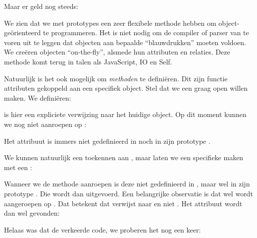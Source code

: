 Maar er geld nog steeds:


We zien dat we met prototypes een zeer flexibele methode hebben om object-geörienteerd te programmeren. Het is niet nodig om de compiler of parser van te voren uit te leggen dat objecten aan bepaalde ``blauwdrukken'' moeten voldoen. We creëren objecten ``on-the-fly'', alsmede hun attributen en relaties. Deze methode komt terug in talen als JavaScript, IO en Self.

Natuurlijk is het ook mogelijk om \emph{methoden} te definiëren. Dit zijn functie attributen gekoppeld aan een specifiek object. Stel dat we een  graag open willen maken. We definiëren:


 is hier een expliciete verwijzing naar het huidige object. Op dit moment kunnen we  nog niet aanroepen op :


Het attribuut  is immers niet gedefinieerd in  noch in zijn prototype .

We kunnen natuurlijk een  toekennen aan , maar laten we een specifieke  maken met een :


Wanneer we de methode  aanroepen is deze niet gedefinieerd in , maar wel in zijn prototype . Die wordt dan uitgevoerd. Een belangrijke observatie is dat  wel wordt aangeroepen op . Dat betekent dat  verwijst naar  en niet . Het attribuut  wordt dan wel gevonden:


Helaas was dat de verkeerde code, we proberen het nog een keer:


